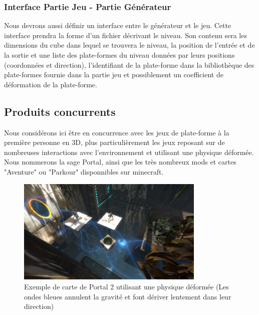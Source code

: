 \documentclass[12pt]{article}
\begin{document}
        \subsubsection{Interface Partie Jeu - Partie Générateur}
            Nous devrons aussi définir un interface entre le générateur et le jeu. Cette interface prendra la forme d'un fichier décrivant le niveau. Son contenu sera les dimensions du cube dans lequel se trouvera le niveau, la position de l'entrée et de la sortie et une liste des plate-formes du niveau données par leurs positions (coordonnées et direction), l'identifiant de la plate-forme dans la bibliothèque des plate-formes fournie dans la partie jeu et possiblement un coefficient de déformation de la plate-forme.
        
    \subsection{Produits concurrents}
        Nous considérons ici être en concurrence avec les jeux de plate-forme à la première personne en 3D, plus particulièrement les jeux reposant sur de nombreuses interactions avec l'environnement et utilisant une physique déformée. Nous nommerons la sage Portal, ainsi que les très nombreux mods et cartes "Aventure" ou "Parkour" disponnibles sur minecraft.
        
        \begin{figure}[h]
        \begin{center}
            \includegraphics[width=0.8\textwidth]{portal2.jpg}
                \caption{Exemple de carte de Portal 2 utilisant une physique déformée (Les ondes bleues annulent la gravité et font dériver lentement dans leur direction)}
        \end{center}
        \end{figure}
        
\end{document}
